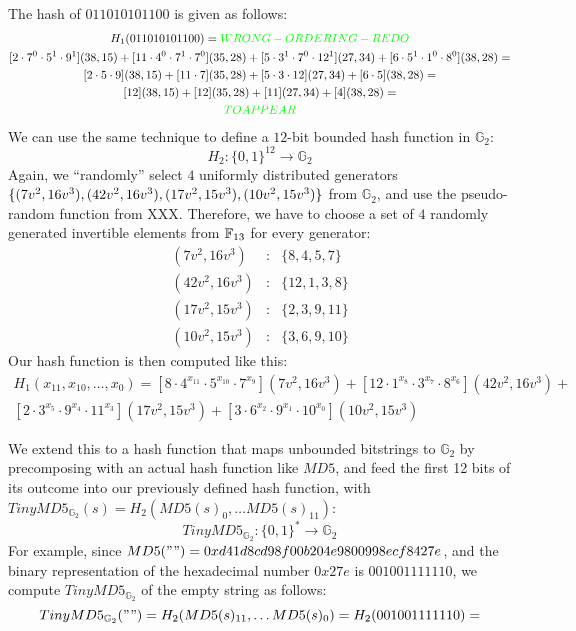 The hash of $011010101100$ is given as follows:
\begin{multline*}
H_1(011010101100)=\textcolor{green}{WRONG-ORDERING-REDO}\\
[2\cdot 7^{0}\cdot 5^{1}\cdot 9^{1}](38,15)+
[11\cdot 4^{0}\cdot 7^{1}\cdot 7^{0}](35,28)+
[5\cdot 3^{1}\cdot 7^{0}\cdot 12^{1}](27,34) +
[6\cdot 5^{1}\cdot 1^{0}\cdot 8^{0}](38,28)=\\
[2\cdot 5\cdot 9](38,15)+
[11\cdot 7](35,28)+
[5\cdot 3\cdot 12](27,34) +
[6\cdot 5](38,28)=\\
[12](38,15)+
[12](35,28)+
[11](27,34) +
[4](38,28)=\\ 
\textcolor{green}{TO APPEAR}
\end{multline*}
We can use the same technique to define a $12$-bit bounded hash function in $\mathbb{G}_2$:  
$$
H_{2}: \{0,1\}^{12} \to \mathbb{G}_2 
$$
Again, we ``randomly'' select $4$ uniformly distributed generators $\{(7v^2 , 16v^3 ), (42v^2 , 16v^3 ), \\(17v^2 , 15v^3 ), (10v^2 , 15v^3 )\}$ from $\mathbb{G}_2$, and use the pseudo-random function from XXX. Therefore, we have to choose a set of $4$ randomly generated invertible elements from $\mathbb{F}_{13}$ for every generator:
$$
\begin{array}{lcl}
(7v^2 , 16v^3 ) &:& \{8,4,5,7\}\\
(42v^2 , 16v^3 ) &:& \{12,1,3,8\}\\
(17v^2 , 15v^3 ) &:& \{2,3,9,11\}\\
(10v^2 , 15v^3 ) &:& \{3,6,9,10\}
\end{array}
$$
Our hash function is then computed like this:
\begin{multline*}
H_1(x_{11},x_{10},\ldots, x_{0})=
[8\cdot 4^{x_{11}}\cdot 5^{x_{10}}\cdot 7^{x_9}](7v^2 , 16v^3)+
[12\cdot 1^{x_8}\cdot 3^{x_7}\cdot 8^{x_6}](42v^2 , 16v^3 )+\\
[2\cdot 3^{x_5}\cdot 9^{x_4}\cdot 11^{x_3}](17v^2 , 15v^3 ) +
[3\cdot 6^{x_2}\cdot 9^{x_{1}}\cdot 10^{x_{0}}](10v^2 , 15v^3 )
\end{multline*}

We extend this to a hash function that maps unbounded bitstrings to $\mathbb{G}_2$ by precomposing with an actual hash function like $MD5$, and feed the first 12 bits of its outcome into our previously defined hash function, with $TinyMD5_{\mathbb{G}_2}(s)= H_2(MD5(s)_0,\ldots MD5(s)_{11})$:
$$
TinyMD5_{\mathbb{G}_2}: \{0,1\}^* \to \mathbb{G}_2
$$
For example, since 
$MD5("")=\\ 0xd41d8cd98f00b204e9800998ecf8427e$, and the binary representation of the hexadecimal number $0x27e$ is $001001111110$, we compute $TinyMD5_{\mathbb{G}_2}$ of the empty string as follows:
$$TinyMD5_{\mathbb{G}_2}("")= H_2(MD5(s)_{11},\ldots MD5(s)_{0}) = H_2(001001111110)=$$





